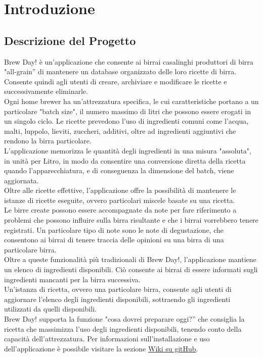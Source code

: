 \documentclass[a4paper,12pt]{report}
\begin{document}
    \newpage
   \tableofcontents
   
   \newpage
    
    
    \chapter{Introduzione}
    
    	\section{Descrizione del Progetto}	
	Brew Day! è un'applicazione che consente ai birrai casalinghi produttori di birra "all-grain” di mantenere un database organizzato delle loro ricette di birra. Consente quindi agli utenti di creare, archiviare e modificare le ricette e successivamente eliminarle.\\
Ogni home brewer ha un'attrezzatura specifica, le cui caratteristiche portano a un particolare "batch size", il numero massimo di litri che possono essere erogati in un singolo ciclo. Le ricette prevedono l’uso di ingredienti comuni come l’acqua, malti, luppolo, lieviti, zuccheri, additivi, oltre ad ingredienti aggiuntivi che rendono la birra particolare.\\
L’applicazione memorizza le quantità degli ingredienti in una misura "assoluta", in unità per Litro, in modo da consentire una conversione diretta della ricetta quando l'apparecchiatura, e di conseguenza la dimensione del batch, viene aggiornata.\\
Oltre alle ricette effettive, l'applicazione offre la possibilità di mantenere le istanze di ricette eseguite, ovvero particolari miscele basate su una ricetta.\\
Le birre create possono essere accompagnate da note per fare riferimento a problemi che possono influire sulla birra risultante e che i birrai vorrebbero tenere registrati. Un particolare tipo di note sono le note di degustazione, che consentono ai birrai di tenere traccia delle opinioni su una birra di una particolare birra.\\
Oltre a queste funzionalità più tradizionali di Brew Day!, l'applicazione mantiene un elenco di ingredienti disponibili. Ciò consente ai birrai di essere informati sugli ingredienti mancanti per la birra successiva.\\
Un'istanza di ricetta, ovvero una particolare birra, consente agli utenti di aggiornare l'elenco degli ingredienti disponibili, sottraendo gli ingredienti utilizzati da quelli disponibili.\\
Brew Day! supporta la funzione "cosa dovrei preparare oggi?” che consiglia la ricetta che massimizza l'uso degli ingredienti disponibili, tenendo conto della capacità dell'attrezzatura.
Per informazioni sull'installazione e uso dell'applicazione è possibile visitare la sezione \href{https://github.com/lta-unimib/progetto-brew-day-1-brew-day-birra/wiki}{Wiki su gitHub}.
\end{document}
